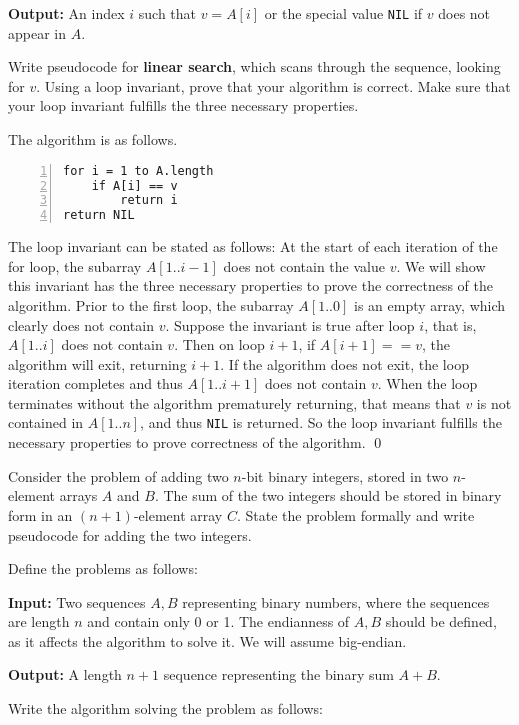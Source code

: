 \textbf{Output:} An index $i$ such that $v = A[i]$ or the special value \verb|NIL| if $v$ does not appear in $A$.

Write pseudocode for \textbf{linear search}, which scans through the sequence, looking for $v$. Using a loop invariant, prove that your algorithm is correct. Make sure that your loop invariant fulfills the three necessary properties.

\sol The algorithm is as follows.

\begin{Verbatim}[frame=single,numbers=left,samepage=true,label={LINEAR-SEARCH(A,v)}]
for i = 1 to A.length
    if A[i] == v
        return i
return NIL
\end{Verbatim}

The loop invariant can be stated as follows: At the start of each iteration of the for loop, the subarray $A[1..i-1]$ does not contain the value $v$. We will show this invariant has the three necessary properties to prove the correctness of the algorithm. Prior to the first loop, the subarray $A[1..0]$ is an empty array, which clearly does not contain $v$. Suppose the invariant is true after loop $i$, that is, $A[1..i]$ does not contain $v$. Then on loop $i+1$, if $A[i+1] == v$, the algorithm will exit, returning $i+1$. If the algorithm does not exit, the loop iteration completes and thus $A[1..i+1]$ does not contain $v$. When the loop terminates without the algorithm prematurely returning, that means that $v$ is not contained in $A[1..n]$, and thus \verb|NIL| is returned. So the loop invariant fulfills the necessary properties to prove correctness of the algorithm. \qed

 Consider the problem of adding two $n$-bit binary integers, stored in two $n$-element arrays $A$ and $B$. The sum of the two integers should be stored in binary form in an $(n+1)$-element array $C$. State the problem formally and write pseudocode for adding the two integers.

\sol Define the problems as follows:

\textbf{Input:} Two sequences $A, B$ representing binary numbers, where the sequences are length $n$ and contain only 0 or 1. The endianness of $A,B$ should be defined, as it affects the algorithm to solve it. We will assume big-endian.

\textbf{Output:} A length $n+1$ sequence representing the binary sum $A+B$.

Write the algorithm solving the problem as follows:


